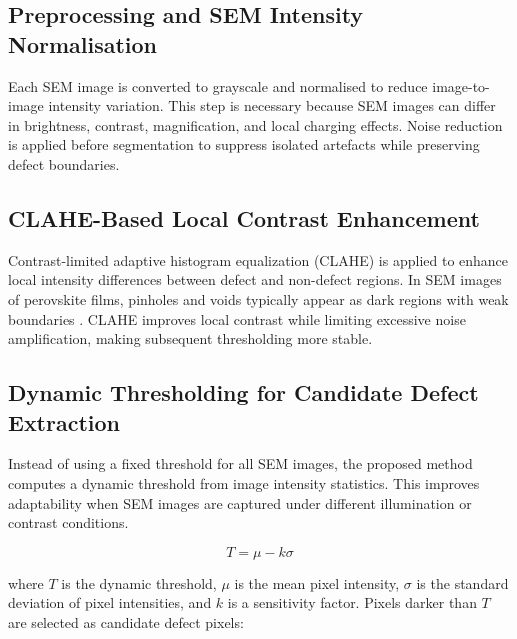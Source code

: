 \documentclass[pdflatex,sn-mathphys-num,iicol]{sn-jnl}
\theoremstyle{thmstyleone}
\theoremstyle{thmstyletwo}
\theoremstyle{thmstylethree}
\begin{document}
\subsection{Preprocessing and SEM Intensity Normalisation}
\label{subsec:preprocessing}

Each SEM image is converted to grayscale and normalised to reduce
image-to-image intensity variation. This step is necessary because
SEM images can differ in brightness, contrast, magnification, and
local charging effects. Noise reduction is applied before segmentation
to suppress isolated artefacts while preserving defect boundaries.

\subsection{CLAHE-Based Local Contrast Enhancement}
\label{subsec:clahe}

Contrast-limited adaptive histogram equalization (CLAHE) is applied
to enhance local intensity differences between defect and non-defect
regions. In SEM images of perovskite films, pinholes and voids
typically appear as dark regions with weak boundaries \cite{chang2026}.
CLAHE improves local contrast while limiting excessive noise
amplification, making subsequent thresholding more stable.


\subsection{Dynamic Thresholding for Candidate Defect Extraction}
\label{subsec:dynamic_thresholding}

Instead of using a fixed threshold for all SEM images, the proposed
method computes a dynamic threshold from image intensity statistics.
This improves adaptability when SEM images are captured under
different illumination or contrast conditions.

\begin{equation}
T = \mu - k\sigma
\label{eq:threshold}
\end{equation}

where $T$ is the dynamic threshold, $\mu$ is the mean pixel
intensity, $\sigma$ is the standard deviation of pixel intensities,
and $k$ is a sensitivity factor. Pixels darker than $T$ are selected
as candidate defect pixels:
\end{document}
